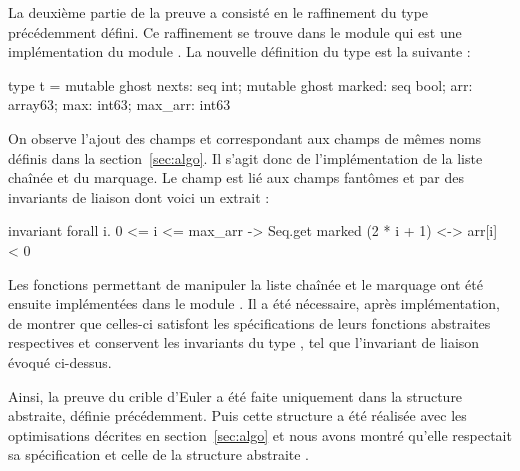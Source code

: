 \documentclass[a4paper]{easychair}
\begin{document}
La deuxième partie de la preuve a consisté en le raffinement du type 
précédemment défini. Ce raffinement se trouve dans le module
 qui est une implémentation du module .
La nouvelle définition du type  est la suivante :
\begin{why3}
type t = {
  mutable ghost nexts: seq int;
  mutable ghost marked: seq bool;
  arr: array63;
  max: int63;
  max_arr: int63
}
\end{why3}
On observe l'ajout des champs  et 
correspondant aux champs de mêmes noms définis dans la section~\ref{sec:algo}.
Il s'agit donc de l'implémentation de la liste chaînée et du marquage.
Le champ  est lié aux champs fantômes  et 
par des invariants de liaison dont voici un extrait :
\begin{why3}
invariant { forall i. 0 <= i <= max_arr ->
                 Seq.get marked (2 * i + 1) <-> arr[i] < 0 }
\end{why3}
Les fonctions permettant de manipuler la liste chaînée et le marquage ont été
ensuite implémen\-tées dans le module .
Il a été nécessaire, après implémentation, de montrer que celles-ci
satisfont les spécifications de leurs fonctions abstraites respectives et
conservent les invariants du type , tel que l'invariant de liaison
évoqué ci-dessus.

Ainsi, la preuve du crible d'Euler a été faite uniquement dans la
structure  abstraite, définie précédemment.
Puis cette structure  a été réalisée avec les optimisations
décrites en section~\ref{sec:algo} et nous avons montré qu'elle
respectait sa spécification et celle de la structure abstraite .
\end{document}
